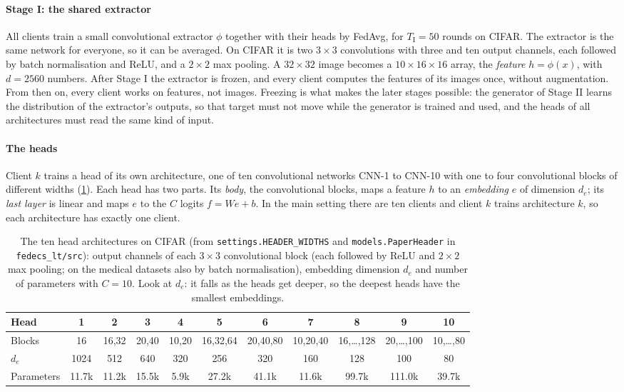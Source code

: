 \paragraph{Stage I: the shared extractor} All clients train a small convolutional extractor $\phi$ together with
their heads by FedAvg, for $T_{\mathrm I}=50$ rounds on CIFAR. The extractor is the same network for everyone, so it
can be averaged. On CIFAR it is two $3\times3$ convolutions with three and ten output channels, each followed by
batch normalisation and ReLU, and a $2\times2$ max pooling. A $32\times32$ image becomes a $10\times16\times16$ array,
the \emph{feature} $h=\phi(x)$, with $d=2560$ numbers. After Stage I the extractor is frozen, and every client computes
the features of its images once, without augmentation. From then on, every client works on features, not images.
Freezing is what makes the later stages possible: the generator of Stage II learns the distribution of the
extractor's outputs, so that target must not move while the generator is trained and used, and the heads of all
architectures must read the same kind of input.

\paragraph{The heads} Client $k$ trains a head of its own architecture, one of ten convolutional networks CNN-1 to
CNN-10 with one to four convolutional blocks of different widths (\cref{tab:s-heads}). Each head has two parts. Its
\emph{body}, the convolutional blocks, maps a feature $h$ to an \emph{embedding} $e$ of dimension $d_e$; its
\emph{last layer} is linear and maps $e$ to the $C$ logits $f=We+b$. In the main setting there are ten clients and
client $k$ trains architecture $k$, so each architecture has exactly one client.

\begin{table}[t]
\centering\small
\caption{The ten head architectures on CIFAR (from \texttt{settings.HEADER\_WIDTHS} and \texttt{models.PaperHeader}
in \texttt{fedecs\_lt/src}): output channels of each $3\times3$ convolutional block (each followed by ReLU and $2\times2$ max pooling; on
the medical datasets also by batch normalisation), embedding dimension $d_e$ and number of parameters with $C=10$. Look
at $d_e$: it falls as the heads get deeper, so the deepest heads have the smallest embeddings.}
\label{tab:s-heads}
\begin{adjustbox}{max width=\linewidth}
\begin{tabular}{lcccccccccc}\toprule
Head & 1 & 2 & 3 & 4 & 5 & 6 & 7 & 8 & 9 & 10\\\midrule
Blocks & 16 & 16,32 & 20,40 & 10,20 & 16,32,64 & 20,40,80 & 10,20,40 & 16,\dots,128 & 20,\dots,100 & 10,\dots,80\\
$d_e$ & 1024 & 512 & 640 & 320 & 256 & 320 & 160 & 128 & 100 & 80\\
Parameters & 11.7k & 11.2k & 15.5k & 5.9k & 27.2k & 41.1k & 11.6k & 99.7k & 111.0k & 39.7k\\\bottomrule
\end{tabular}
\end{adjustbox}
\end{table}

